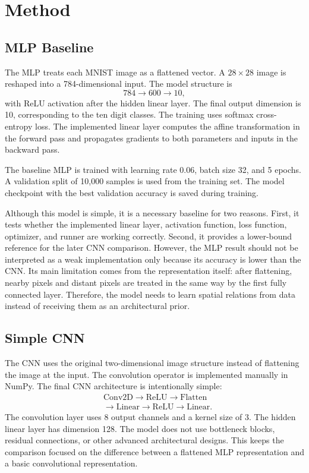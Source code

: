 \documentclass[10pt,twocolumn]{article}
\begin{document}
\section{Method}
\subsection{MLP Baseline}
The MLP treats each MNIST image as a flattened vector. A $28 \times 28$ image is reshaped into a 784-dimensional input. The model structure is
\begin{equation}
784 \rightarrow 600 \rightarrow 10,
\end{equation}
with ReLU activation after the hidden linear layer. The final output dimension is 10, corresponding to the ten digit classes. The training uses softmax cross-entropy loss. The implemented linear layer computes the affine transformation in the forward pass and propagates gradients to both parameters and inputs in the backward pass.

The baseline MLP is trained with learning rate 0.06, batch size 32, and 5 epochs. A validation split of 10,000 samples is used from the training set. The model checkpoint with the best validation accuracy is saved during training.

Although this model is simple, it is a necessary baseline for two reasons. First, it tests whether the implemented linear layer, activation function, loss function, optimizer, and runner are working correctly. Second, it provides a lower-bound reference for the later CNN comparison. However, the MLP result should not be interpreted as a weak implementation only because its accuracy is lower than the CNN. Its main limitation comes from the representation itself: after flattening, nearby pixels and distant pixels are treated in the same way by the first fully connected layer. Therefore, the model needs to learn spatial relations from data instead of receiving them as an architectural prior.

\subsection{Simple CNN}
The CNN uses the original two-dimensional image structure instead of flattening the image at the input. The convolution operator is implemented manually in NumPy. The final CNN architecture is intentionally simple:
\begin{equation}
\begin{aligned}
&\mathrm{Conv2D} \rightarrow \mathrm{ReLU} \rightarrow \mathrm{Flatten} \\
&\rightarrow \mathrm{Linear} \rightarrow \mathrm{ReLU} \rightarrow \mathrm{Linear}.
\end{aligned}
\end{equation}
The convolution layer uses 8 output channels and a kernel size of 3. The hidden linear layer has dimension 128. The model does not use bottleneck blocks, residual connections, or other advanced architectural designs. This keeps the comparison focused on the difference between a flattened MLP representation and a basic convolutional representation.
\end{document}
